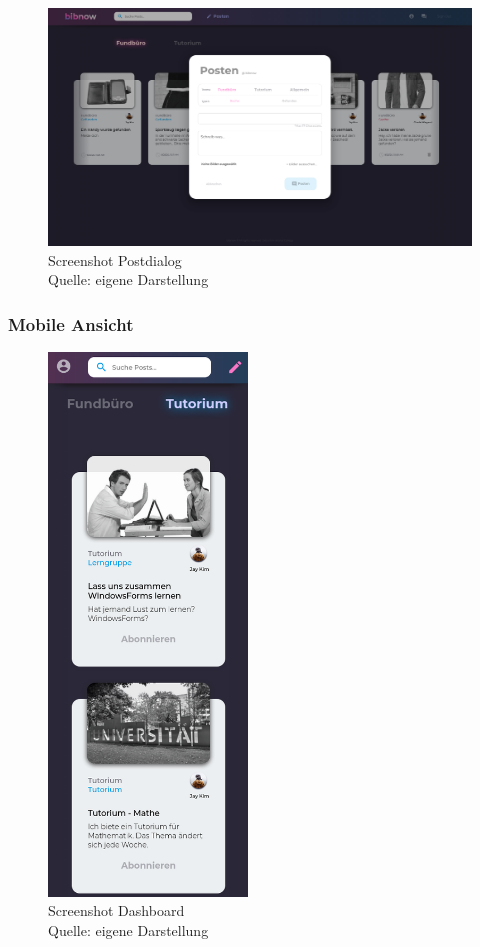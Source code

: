 \documentclass[12pt,titlepage]{article}
\begin{document}
\begin{figure}[hbt!]
\centering
\includegraphics[width=400pt]{screenshots/Screenshot_Desktop_Posten.png}
\caption[Sreenshot Postdialog]{Screenshot Postdialog\\Quelle: eigene Darstellung}
\end{figure}

\FloatBarrier

\subsubsection{Mobile Ansicht}

\begin{figure}[hbt!]
\centering
\includegraphics[width=150pt]{screenshots/Screenshot_Mobil_Dashboard.png}
\caption[Sreenshot Dashboard]{Screenshot Dashboard \\Quelle: eigene Darstellung}
\end{figure}
\end{document}
